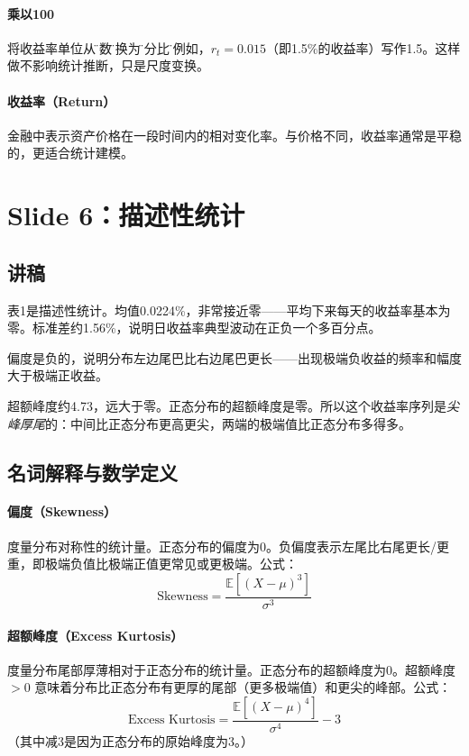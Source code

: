 \documentclass[11pt,a4paper]{article}
\begin{document}
\paragraph{乘以100} 将收益率单位从\"小数\"转换为\"百分比\"。例如，\(r_t = 0.015\)（即1.5\%的收益率）写作1.5。这样做不影响统计推断，只是尺度变换。

\paragraph{收益率（Return）} 金融中表示资产价格在一段时间内的相对变化率。与价格不同，收益率通常是平稳的，更适合统计建模。

\newpage
\section*{Slide 6：描述性统计}

\subsection*{讲稿}
表1是描述性统计。均值0.0224\%，非常接近零——平均下来每天的收益率基本为零。标准差约1.56\%，说明日收益率典型波动在正负一个多百分点。

偏度是负的，说明分布左边尾巴比右边尾巴更长——出现极端负收益的频率和幅度大于极端正收益。

超额峰度约4.73，远大于零。正态分布的超额峰度是零。所以这个收益率序列是\emph{尖峰厚尾}的：中间比正态分布更高更尖，两端的极端值比正态分布多得多。

\subsection*{名词解释与数学定义}

\paragraph{偏度（Skewness）} 度量分布对称性的统计量。正态分布的偏度为0。负偏度表示左尾比右尾更长/更重，即极端负值比极端正值更常见或更极端。公式：
\[
\text{Skewness} = \frac{\mathbb{E}[(X - \mu)^3]}{\sigma^3}
\]

\paragraph{超额峰度（Excess Kurtosis）} 度量分布尾部厚薄相对于正态分布的统计量。正态分布的超额峰度为0。超额峰度 \(>0\) 意味着分布比正态分布有更厚的尾部（更多极端值）和更尖的峰部。公式：
\[
\text{Excess Kurtosis} = \frac{\mathbb{E}[(X - \mu)^4]}{\sigma^4} - 3
\]
（其中减3是因为正态分布的原始峰度为3。）
\end{document}
